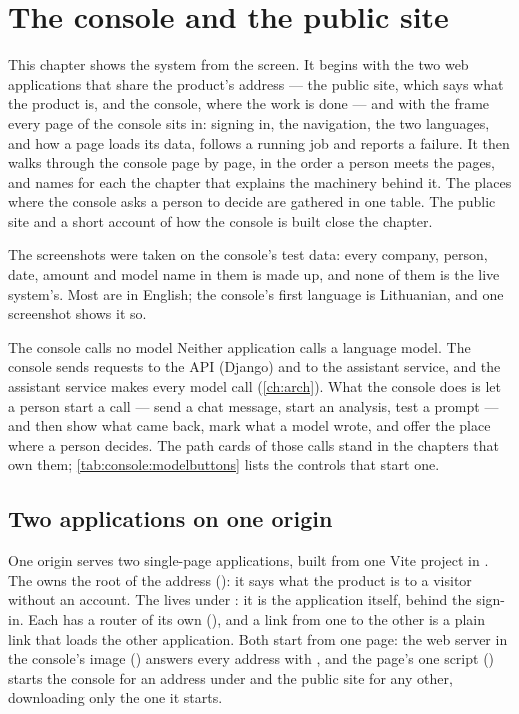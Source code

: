 \chapter{The console and the public site}\label{ch:console}

This chapter shows the system from the screen. It begins with the two web applications that
share the product's address --- the public site, which says what the product is, and the
console, where the work is done --- and with the frame every page of the console sits in:
signing in, the navigation, the two languages, and how a page loads its data, follows a running
job and reports a failure. It then walks through the console page by page, in the order a
person meets the pages, and names for each the chapter that explains the machinery behind it.
The places where the console asks a person to decide are gathered in one table. The public
site and a short account of how the console is built close the chapter.

The screenshots were taken on the console's test data: every company, person, date, amount and
model name in them is made up, and none of them is the live system's. Most are in English; the
console's first language is Lithuanian, and one screenshot shows it so.

\begin{notebox}{The console calls no model}
Neither application calls a language model. The console sends requests to the API (Django) and
to the assistant service, and the assistant service makes every model call (\cref{ch:arch}). What the console does is let a
person start a call --- send a chat message, start an analysis, test a prompt --- and then show
what came back, mark what a model wrote, and offer the place where a person decides. The path
cards of those calls stand in the chapters that own them; \cref{tab:console:modelbuttons} lists
the controls that start one.
\end{notebox}

\section{Two applications on one origin}\label{sec:console:origin}

One origin serves two single-page applications, built from one Vite project in
. The  owns the root of the address (\code{/}): it says
what the product is to a visitor without an account. The  lives under
: it is the application itself, behind the sign-in. Each has a router of its
own (), and a link from one to the other is a plain link that loads the other
application. Both start from one page: the web server in the console's image
() answers every address with , and the page's
one script () starts the console for an address under  and the
public site for any other, downloading only the one it starts.

